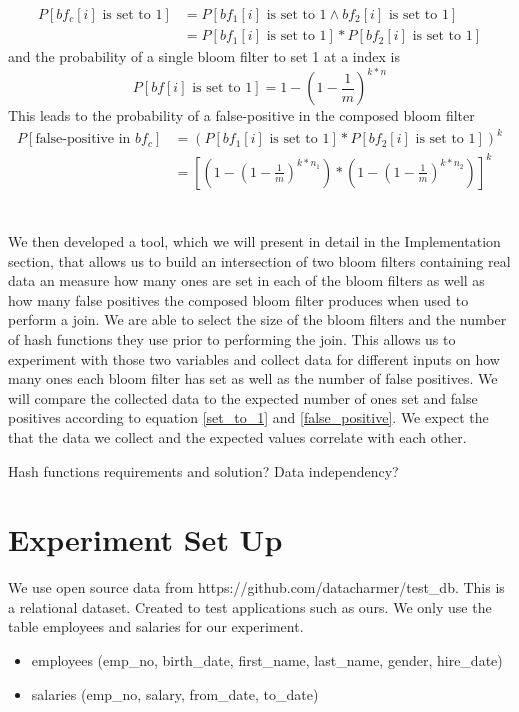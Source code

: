 \documentclass[12]{scrartcl}
\begin{document}
\begin{equation}
\begin{split}
	P[bf_c[i] \text{ is set to 1}] &= P[bf_1[i] \text{ is set to 1} \wedge bf_2[i] \text{ is set to 1}]\\
	&= P[bf_1[i] \text{ is set to 1}] * P[bf_2[i] \text{ is set to 1}]
\end{split}
\end{equation}
and the probability of a single bloom filter to set 1 at a index is
\begin{equation}
\label{set_to_1}
P[bf[i] \text{ is set to 1}] = 1-(1-\frac{1}{m})^{k*n}
\end{equation}
This leads to the probability of a false-positive in the composed bloom filter
\begin{equation}
\label{false_positive}
\begin{split}
P[\text{false-positive in }bf_c] &= (P[bf_1[i] \text{ is set to 1}] * P[bf_2[i] \text{ is set to 1}])^k\\
&= [(1-(1-\frac{1}{m})^{k*n_1}) * (1-(1-\frac{1}{m})^{k*n_2})]^k
\end{split}
\end{equation}\\\\
We then developed a tool, which we will present in detail in the Implementation section, that allows us to build an intersection of two bloom filters containing real data an measure how many ones are set in each of the bloom filters as well as how many false positives the composed bloom filter produces when used to perform a join. We are able to select the size of the bloom filters and the number of hash functions they use prior to performing the join. This allows us to experiment with those two variables and collect data for different inputs on how many ones each bloom filter has set as well as the number of false positives. We will compare the collected data to the expected number of ones set and false positives according to equation \ref{set_to_1} and \ref{false_positive}. We expect the that the data we collect and the expected values correlate with each other.
 
 Hash functions requirements and solution?
 Data independency?

\section{Experiment Set Up}
We use open source data from https://github.com/datacharmer/test\_db. This is a relational dataset. Created to test applications such as ours. We only use the table employees and salaries for our experiment.
\begin{itemize}
	\item employees (emp\_no, birth\_date, first\_name, last\_name, gender, hire\_date)
	\item salaries (emp\_no, salary, from\_date, to\_date)
\end{itemize}
\vspace{1cm}
\end{document}
